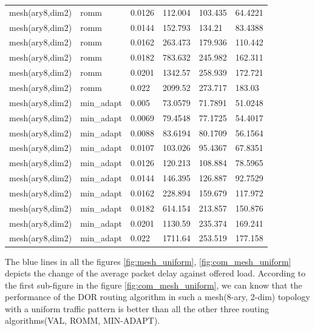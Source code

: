 \begin{longtable}[H]{llllll}
mesh(ary8,dim2) & romm       & 0.0126 & 112.004 & 103.435 & 64.4221 \\
mesh(ary8,dim2) & romm       & 0.0144 & 152.793 & 134.21  & 83.4388 \\
mesh(ary8,dim2) & romm       & 0.0162 & 263.473 & 179.936 & 110.442 \\
mesh(ary8,dim2) & romm       & 0.0182 & 783.632 & 245.982 & 162.311 \\
mesh(ary8,dim2) & romm       & 0.0201 & 1342.57 & 258.939 & 172.721 \\
mesh(ary8,dim2) & romm       & 0.022  & 2099.52 & 273.717 & 183.03  \\ \hline
mesh(ary8,dim2) & min\_adapt & 0.005  & 73.0579 & 71.7891 & 51.0248 \\
mesh(ary8,dim2) & min\_adapt & 0.0069 & 79.4548 & 77.1725 & 54.4017 \\
mesh(ary8,dim2) & min\_adapt & 0.0088 & 83.6194 & 80.1709 & 56.1564 \\
mesh(ary8,dim2) & min\_adapt & 0.0107 & 103.026 & 95.4367 & 67.8351 \\
mesh(ary8,dim2) & min\_adapt & 0.0126 & 120.213 & 108.884 & 78.5965 \\
mesh(ary8,dim2) & min\_adapt & 0.0144 & 146.395 & 126.887 & 92.7529 \\
mesh(ary8,dim2) & min\_adapt & 0.0162 & 228.894 & 159.679 & 117.972 \\
mesh(ary8,dim2) & min\_adapt & 0.0182 & 614.154 & 213.857 & 150.876 \\
mesh(ary8,dim2) & min\_adapt & 0.0201 & 1130.59 & 235.374 & 169.241 \\
mesh(ary8,dim2) & min\_adapt & 0.022  & 1711.64 & 253.519 & 177.158
\end{longtable}

The blue lines in all the figures \ref{fig:mesh_uniform}, \ref{fig:com_mesh_uniform} depicts the change of the average packet delay against offered load. According to the first sub-figure in the figure \ref{fig:com_mesh_uniform}, we can know that the performance of the DOR routing algorithm in such a mesh(8-ary, 2-dim) topology with a uniform traffic pattern is better than all the other three routing algorithms(VAL, ROMM, MIN-ADAPT).



